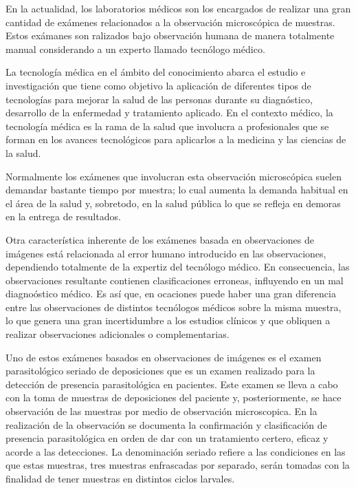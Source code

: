 \documentclass[letter,12pt]{report}
\begin{document}
En la actualidad, los laboratorios médicos son los encargados de realizar una gran
cantidad de exámenes relacionados a la observación microscópica de muestras. Estos
exámanes son ralizados bajo observación humana de manera totalmente manual
considerando a un experto llamado tecnólogo médico. 

La tecnología médica en el ámbito del conocimiento abarca el estudio e investigación
que tiene como objetivo la aplicación de diferentes tipos de tecnologías para mejorar
la salud de las personas durante su diagnóstico, desarrollo de la enfermedad y
tratamiento aplicado. En el contexto médico, la tecnología médica es la rama de la
salud que involucra a profesionales que se forman en los avances tecnológicos para
aplicarlos a la medicina y las ciencias de la salud.

Normalmente los exámenes que involucran esta observación microscópica suelen demandar
bastante tiempo por muestra; lo cual aumenta la demanda habitual en el área de la
salud y, sobretodo, en la salud pública lo que se refleja en demoras en la entrega de
resultados.


Otra característica inherente de los exámenes basada en observaciones de imágenes
está relacionada al error humano introducido en las observaciones, dependiendo
totalmente de la expertiz del tecnólogo médico.  En consecuencia, las observaciones
resultante contienen clasificaciones erroneas, influyendo en un mal diagnoóstico
médico. Es así que, en ocaciones puede haber una gran diferencia entre las
observaciones de distintos tecnólogos médicos sobre la misma muestra, lo que genera
una gran incertidumbre a los estudios clínicos y que obliquen a realizar
observaciones adicionales o complementarias.

Uno de estos exámenes basados en observaciones de imágenes es el examen parasitológico 
seriado de deposiciones  que es un examen realizado para la
detección de presencia parasitológica en pacientes. Este examen se lleva a cabo con la
toma de muestras de deposiciones del paciente y, posteriormente, se hace observación
de las muestras por medio de observación microscopica. En la realización de la
observación se documenta la confirmación y clasificación de presencia parasitológica
en orden de dar con un tratamiento certero, eficaz y acorde a las detecciones. %
La denominación seriado refiere a las condiciones en las que estas muestras, tres
muestras enfrascadas por separado, serán tomadas con la finalidad de tener muestras
en distintos ciclos larvales.
\end{document}
